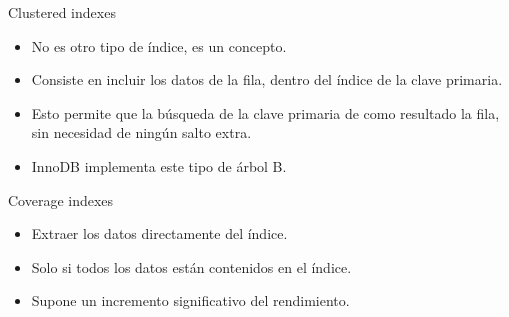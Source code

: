 \begin{frame}{Clustered indexes}
  \begin{itemize}
    \item No es otro tipo de índice, es un concepto.
    \item Consiste en incluir los datos de la fila, dentro del índice de la clave primaria.
    \item Esto permite que la búsqueda de la clave primaria de como resultado la fila, sin necesidad de ningún salto extra.
    \item InnoDB implementa este tipo de árbol B.
  \end{itemize}
\end{frame}

\begin{frame}{Coverage indexes}
  \begin{itemize}
    \item Extraer los datos directamente del índice.
    \item Solo si todos los datos están contenidos en el índice.
    \item Supone un incremento significativo del rendimiento.
  \end{itemize}
\end{frame}
